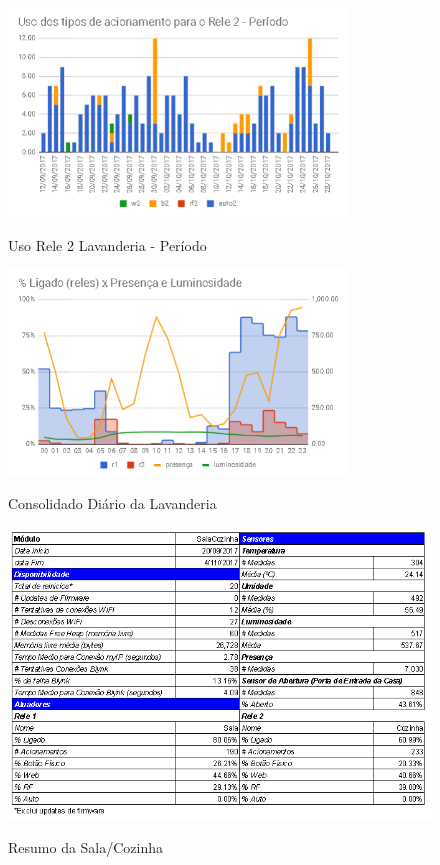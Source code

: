 \begin{figure}[H]
	\centering
	\caption{Uso Rele 2 Lavanderia - Período}
	\includegraphics[width=0.8\textwidth]{UsoRele2LavanderiaPeriodo}
	\label{fig:UsoRele2LavanderiaPeriodo}
\end{figure}

\begin{figure}[H]
	\centering
	\caption{Consolidado Diário da Lavanderia}
	\includegraphics[width=0.8\textwidth]{RelesPresLumiLavanderia}
	\label{fig:RelesPresLumiLavanderia}
\end{figure}

\begin{figure}[H]
	\centering
	\caption{Resumo da Sala/Cozinha}
	\includegraphics[width=1.0\textwidth]{resumoSalaCozinha}
	\label{fig:resumoSalaCozinha}
\end{figure}

